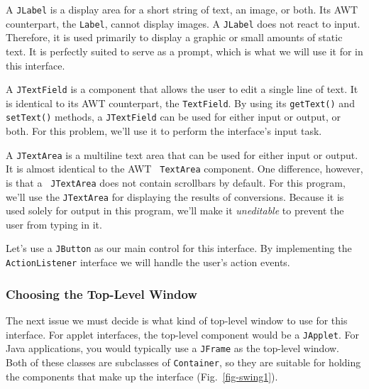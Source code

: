 \begin{BL}

\item  A {\tt JLabel} is a display area for a short string of text,  an
image, or both.  Its AWT counterpart, the {\tt Label}, cannot display
images.  A \mbox{\tt JLabel} does not react to input.  Therefore, it is used
primarily to display a graphic or small amounts of static text.  It is
perfectly suited to serve as a prompt, which is what we will use it
for in this interface.

\item  A {\tt JTextField} is a component that allows the user to edit
a single line of text.  It is identical to its AWT counterpart,
the {\tt TextField}. By using its {\tt getText()} and {\tt setText()}
methods, a {\tt JTextField} can be used for either input or output, or
both.  For this problem, we'll use it to perform the interface's input
task.

\item A {\tt JTextArea} is a multiline text area that can be used for
either input or output.  It is almost identical to the AWT {\tt
TextArea} component.  One difference, however, is that a {\tt
JTextArea} does not contain scrollbars by default.  For this program,
we'll use the {\tt JTextArea} for displaying the results of
conversions.  Because it is used solely for output in this program,
we'll make it {\it uneditable} to prevent the user from typing in it.

\item  Let's use a {\tt JButton} as our main
control for this interface.  By implementing the {\tt ActionListener}
interface we will handle the user's action events.

\end{BL}

\subsubsection*{Choosing the Top-Level Window}
\noindent The next issue we must decide is what kind of top-level
window to use for this interface.  For applet interfaces, the top-level
component would be a {\tt JApplet}.  For Java applications, you would
typically use a {\tt JFrame} as the top-level window.  Both of these
classes are subclasses of {\tt Container}, so they are suitable for
holding the components that make up the interface
(Fig.~\ref{fig-swing1}).


